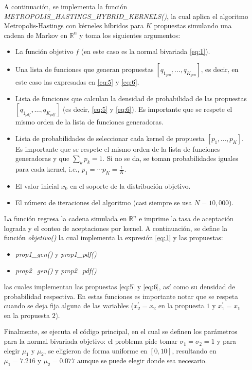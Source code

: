 A continuación, se implementa la función \textit{METROPOLIS\_HASTINGS\_HYBRID\_KERNELS()}, la cual aplica el algoritmo Metropolis-Hastings con kérneles híbridos para $K$ propuestas simulando una cadena de Markov en $\mathbb{R}^n$ y toma los siguientes argumentos:
\begin{itemize}
	\item La función objetivo $f$ (en este caso es la normal bivariada \eqref{eq:1}).
	\item Una lista de funciones que generan propuestas $[q_{1_{gen}}, \dots, q_{K_{gen}}]$, es decir, en este caso las expresadas en \eqref{eq:5} y \eqref{eq:6}.
	\item Lista de funciones que calculan la densidad de probabilidad de las propuestas $[q_{1_{pdf}}, \dots, q_{K_{pdf}}]$ (es decir, \eqref{eq:5} y \eqref{eq:6}). Es importante que se respete el mismo orden de la lista de funciones generadoras.
	\item Lista de probabilidades de seleccionar cada kernel de propuesta $[p_1,\dots,p_{K}]$. Es importante que se respete el mismo orden de la lista de funciones generadoras y que $\sum_{k} p_k =1$. Si no se da, se toman probabilidades iguales para cada kernel, i.e., $p_1=\cdots p_K = \frac{1}{K}$.
	\item El valor inicial $x_0$ en el soporte de la distribución objetivo.
	\item El número de iteraciones del algoritmo (casi siempre se usa $N = 10,000$).
\end{itemize}

La función regresa la cadena simulada en $\mathbb{R}^n$ e imprime la tasa de aceptación lograda y el conteo de aceptaciones por kernel. A continuación, se define la función \textit{objetivo()} la cual implementa la expresión \eqref{eq:1} y las propuestas:
\begin{itemize}
	\item \textit{prop1\_gen()}  y \textit{prop1\_pdf()}
	\item \textit{prop2\_gen()} y \textit{prop2\_pdf()}
\end{itemize}
las cuales implementan las propuestas \eqref{eq:5} y \eqref{eq:6}, así como su densidad de probabilidad respectiva. En estas funciones es importante notar que se respeta cuando se deja fija alguna de las variables ($x_{2}^{'}=x_2$ en la propuesta $1$ y $x_{1}^{'}=x_1$ en la propuesta $2$).

Finalmente, se ejecuta el código principal, en el cual se definen los parámetros para la normal bivariada objetivo: el problema pide tomar $\sigma_{1}=\sigma_{2}=1$ y para elegir $\mu_1$ y $\mu_2$, se eligieron de forma uniforme en $[0,10]$, resultando en $\mu_1=7.216$ y $\mu_2 = 0.077$ aunque se puede elegir donde sea necesario.

